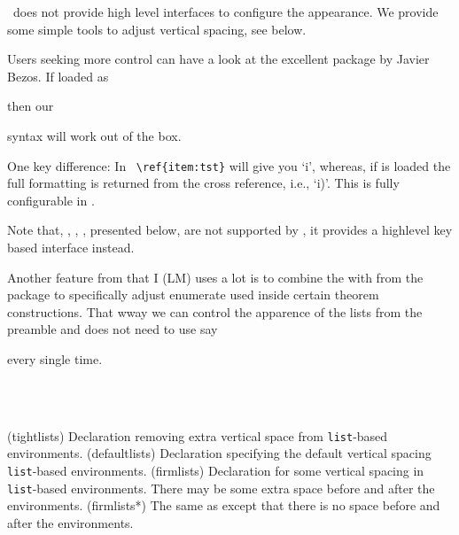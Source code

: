 \begin{recommended}
    \theclass\ does not provide high level interfaces to configure the
  appearance. We provide some simple tools to adjust vertical spacing,
  see below.

  Users seeking more control can have a look at the excellent 
  package by Javier Bezos. If loaded as
  \begin{lcode}
    \usepackage[shortlabels]{enumitem}
  \end{lcode}
  then our
  syntax will work out of the box.

  One key difference: In \theclass\ \verb?\ref{item:tst}? will give you
  `i', whereas, if  is loaded the full formatting is
  returned from the cross reference, i.e., `i)'. This is fully
  configurable in .

  Note that, \cmd{\tightlists}, , \cmd{\firmlists},
  \cmd{\firmlists*} presented below, are not supported by
  , it provides a highlevel key based interface
  instead.

  Another feature from  that I (LM) uses a lot is to
  combine the \cmd{\setlist} with \cmd{\AtBeginEnvironment} from the
   package to specifically adjust enumerate used
  inside certain theorem constructions. That wway we can control the
  apparence of the lists from the preamble and does not need to use
  say
  \begin{lcode}
    \begin{enumerate}[(a)]
  \end{lcode}
  every single time.
\end{recommended}




\begin{syntax}
\cmd{\tightlists}  \\
\cmd{\firmlists} \cmd{\firmlists*} \\
\end{syntax}
\glossary(tightlists)%
  {}%
  {Declaration removing extra vertical space from \texttt{list}-based 
   environments.}
\glossary(defaultlists)%
  {}%
  {Declaration specifying the default vertical spacing \texttt{list}-based 
   environments.}
\glossary(firmlists)%
  {}%
  {Declaration for some vertical spacing in \texttt{list}-based
   environments. There may be some extra space before and after the 
   environments.}
\glossary(firmlists*)%
  {}%
  {The same as  except that there is no space before and after
   the environments.}




